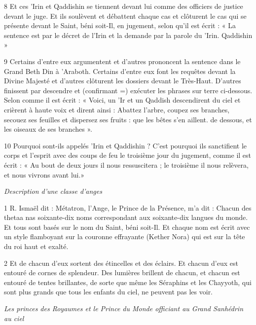 \par 8 Et ces 'Irin et Qaddishin se tiennent devant lui comme des officiers de justice devant le juge. Et ils soulèvent et débattent chaque cas et clôturent le cas qui se présente devant le Saint, béni soit-Il, en jugement, selon qu'il est écrit : « La sentence est par le décret de l'Irin et la demande par la parole du 'Irin. Qaddishin »

\par 9 Certains d'entre eux argumentent et d'autres prononcent la sentence dans le Grand Beth Din à 'Araboth. Certains d'entre eux font les requêtes devant la Divine Majesté et d'autres clôturent les dossiers devant le Très-Haut. D'autres finissent par descendre et (confirmant =) exécuter les phrases sur terre ci-dessous. Selon comme il est écrit : « Voici, un 'Ir et un Qaddish descendirent du ciel et crièrent à haute voix et dirent ainsi : Abattez l'arbre, coupez ses branches, secouez ses feuilles et dispersez ses fruits : que les bêtes s'en aillent. de dessous, et les oiseaux de ses branches ».

\par 10 Pourquoi sont-ils appelés 'Irin et Qaddishin ? C'est pourquoi ils sanctifient le corps et l'esprit avec des coups de feu le troisième jour du jugement, comme il est écrit : « Au bout de deux jours il nous ressuscitera ; le troisième il nous relèvera, et nous vivrons avant lui.»


\par \textit{Description d'une classe d'anges}

\par 1 R. Ismaël dit : Métatron, l'Ange, le Prince de la Présence, m'a dit : Chacun des thetaa nas soixante-dix noms correspondant aux soixante-dix langues du monde. Et tous sont basés sur le nom du Saint, béni soit-Il. Et chaque nom est écrit avec un style flamboyant sur la couronne effrayante (Kether Nora) qui est sur la tête du roi haut et exalté.

\par 2 Et de chacun d'eux sortent des étincelles et des éclairs. Et chacun d’eux est entouré de cornes de splendeur. Des lumières brillent de chacun, et chacun est entouré de tentes brillantes, de sorte que même les Séraphins et les Chayyoth, qui sont plus grands que tous les enfants du ciel, ne peuvent pas les voir.


\par \textit{Les princes des Royaumes et le Prince du Monde officiant au Grand Sanhédrin au ciel}

